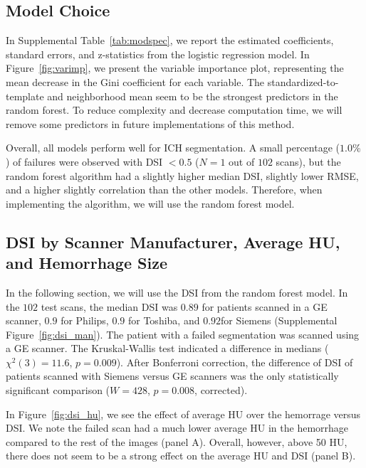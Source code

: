 \documentclass{elsarticle_nonatbib}\usepackage[]{graphicx}\usepackage[]{color}
\begin{document}
\subsection{Model Choice}
In Supplemental Table~\ref{tab:modspec}, we report the estimated coefficients, standard errors, and z-statistics from the logistic regression model.  In Figure~\ref{fig:varimp}, we present the variable importance plot, representing the mean decrease in the Gini coefficient for each variable.  The standardized-to-template and neighborhood mean seem to be the strongest predictors in the random forest.  To reduce complexity and decrease computation time, we will remove some predictors in future implementations of this method.  

Overall, all models perform well for ICH segmentation.  A small percentage ($1.0\%$) of failures were observed with DSI $< 0.5$ ($N = 1$ out of $102$ scans), but the random forest algorithm had a slightly higher median DSI, slightly lower RMSE, and a higher slightly correlation than the other models.  Therefore, when implementing the algorithm, we will use the random forest model.



\subsection{DSI by Scanner Manufacturer, Average HU, and Hemorrhage Size}
In the following section, we will use the DSI from the random forest model.  In the $102$ test scans, the median DSI was $0.89$ for patients scanned in a GE scanner, $0.9$ for Philips, $0.9$ for Toshiba, and $0.92$for Siemens (Supplemental Figure~\ref{fig:dsi_man}).  The patient with a failed segmentation was scanned using a GE scanner.  The Kruskal-Wallis test indicated a difference in medians ($\chi^2(3) = 11.6
$, $p = 0.009$).  After Bonferroni correction, the difference of DSI of patients scanned with Siemens versus GE scanners was the only statistically significant comparison ($W = 428
$, $p = 0.008$, corrected).

In Figure~\ref{fig:dsi_hu}, we see the effect of average HU over the hemorrage versus DSI.  We note the failed scan had a much lower average HU in the hemorrhage compared to the rest of the images (panel A).  Overall, however, above 50 HU, there does not seem to be a strong effect on the average HU and DSI (panel B).
\end{document}
